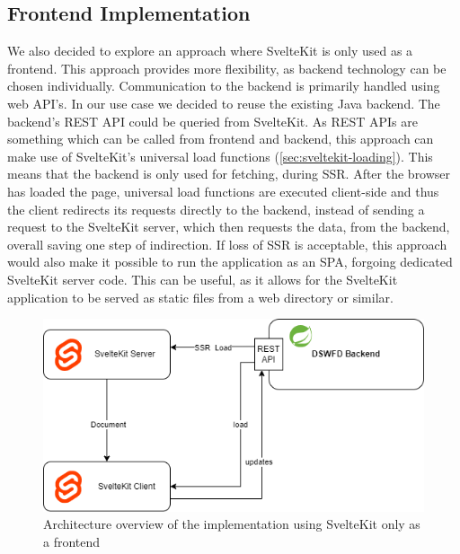 \subsection{Frontend Implementation}



We also decided to explore an approach where SvelteKit is only used as a frontend. This approach provides more flexibility, as backend technology can be chosen individually. Communication to the backend is primarily handled using web API's. In our use case we decided to reuse the existing Java backend. The backend's REST API could be queried from SvelteKit. As REST APIs are something which can be called from frontend and backend, this approach can make use of SvelteKit's universal load functions (\ref{sec:sveltekit-loading}). This means that the backend is only used for fetching, during SSR. After the browser has loaded the page, universal load functions are executed client-side and thus the client redirects its requests directly to the backend, instead of sending  a request to the SvelteKit server, which then requests the data, from the backend, overall saving one step of indirection. If loss of SSR is acceptable, this approach would also make it possible to run the application as an SPA, forgoing dedicated SvelteKit server code. This can be useful, as it allows for the SvelteKit application to be served as static files from a web directory or similar.

\begin{figure}[ht]
    \centering
    \includegraphics[width=.6\linewidth]{assets/fe-only-client-takes-over}
    \caption{Architecture overview of the implementation using SvelteKit only as a frontend}
    \label{fig:dswfd-architecture-fe-only}
\end{figure}

